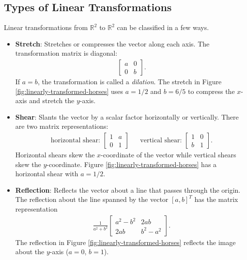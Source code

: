 \subsection*{Types of Linear Transformations} %

Linear transformations from $\mathbb{R}^2$ to $\mathbb{R}^2$ can be classified in a few ways.

\begin{itemize}

\item \textbf{Stretch}: %
Stretches or compresses the vector along each axis.
The transformation matrix is diagonal:
%
\begin{align*}
\left[\begin{array}{rr}
a & 0  \\
0 & b
\end{array}\right].
\end{align*}
%
If $a=b$, the transformation is called a \emph{dilation}.
The stretch in Figure \ref{fig:linearly-transformed-horses} uses $a = 1/2$ and $b = 6/5$ to compress the $x$-axis and stretch the $y$-axis.

\item \textbf{Shear}: %
Slants the vector by a scalar factor horizontally or vertically.
There are two matrix representations:
%
\begin{align*}
\text{horizontal shear:\ }
\left[\begin{array}{cc}
1 & a\\
0 & 1
\end{array}\right]
&&
\text{vertical shear:\ }
\left[\begin{array}{cc}
1 & 0\\
b & 1
\end{array}\right].
\end{align*}
%
Horizontal shears skew the $x$-coordinate of the vector while vertical shears skew the $y$-coordinate.
Figure \ref{fig:linearly-transformed-horses} has a horizontal shear with $a=1/2$.

\item \textbf{Reflection}: Reflects the vector about a line that passes through the origin.
The reflection about the line spanned by the vector $\left[a, b\right]^T$ has the matrix representation
%
\begin{align*}
\frac{1}{a^2 + b^2}
\left[\begin{array}{cc}
a^2 - b^2 & 2ab \\
2ab       & b^2 - a^2
\end{array}\right].
\end{align*}
%
The reflection in Figure \ref{fig:linearly-transformed-horses} reflects the image about the $y$-axis ($a=0$, $b=1$).


\end{itemize}
